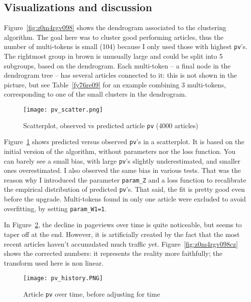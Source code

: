 \documentclass[oneside,10pt]{book}
\begin{document}
\subsection{Visualizations and discussion}

Figure~\ref{fig:z0m4rgv098} shows the dendrogram associated to the clustering algorithm. 
The goal here was to cluster good performing articles, thus the number of multi-tokens is small (104) because I only
 used those with highest \texttt{pv}'s. The rightmost group in brown is unusually large and could be split into 5 subgroups,
 based on the dendrogram. Each multi-token -- a final node in the dendrogram tree -- has several articles connected to it: this is not shown in the picture, but see
 Table~\ref{fy76re09} for an example combining 3 multi-tokens, corresponding to one of the small clusters in the dendrogram. 

\begin{figure}[H]
\centering
\texttt{[image: pv\_scatter.png]}
\caption{Scatterplot, observed vs predicted article \texttt{pv} (4000 articles)}
\label{fig:z0m4rgv098cx}
\end{figure}

Figure~\ref{fig:z0m4rgv098cx} shows predicted versus observed \texttt{pv}'s in a scatterplot. It is based on
 the initial version of the algorithm, without parameters nor the loss function. You can barely see a small bias, with large \texttt{pv}'s
 slightly underestimated, and smaller ones overestimated. I also observed the same bias in various tests. That was the reason
 why I introduced the parameter \texttt{param\_Z} and a loss function to recalibrate the empirical distribution of predicted \texttt{pv}'s.  
That said, the fit is pretty good even before the upgrade. Multi-tokens found in only one article were excluded to
 avoid overfitting, by setting \texttt{param\_W1=1}. 

In Figure~\ref{fig:z0m4rgv098cy}, the decline in pageviews over time is quite noticeable, but seems to taper off at the end. However, it is artificially created by the fact that the most recent articles haven't accumulated much traffic yet. Figure~\ref{fig:z0m4rgv098cz} shows the corrected numbers: it represents the reality more faithfully; the transform used here is non linear.  


\begin{figure}[H]
\centering
\texttt{[image: pv\_history.PNG]}
\caption{Article \texttt{pv} over time, before adjusting for time}
\label{fig:z0m4rgv098cy}
\end{figure}
\end{document}
